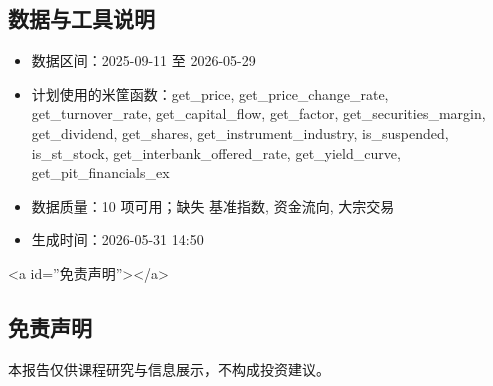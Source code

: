 \documentclass[12pt,a4paper]{article}
\begin{document}
\subsection{ 数据与工具说明}
\begin{itemize}
\item 数据区间：2025-09-11 至 2026-05-29
\item 计划使用的米筐函数：get\_price, get\_price\_change\_rate, get\_turnover\_rate, get\_capital\_flow, get\_factor, get\_securities\_margin, get\_dividend, get\_shares, get\_instrument\_industry, is\_suspended, is\_st\_stock, get\_interbank\_offered\_rate, get\_yield\_curve, get\_pit\_financials\_ex
\item 数据质量：10 项可用；缺失 基准指数, 资金流向, 大宗交易
\item 生成时间：2026-05-31 14:50
\end{itemize}

<a id=''免责声明''></a>

\subsection{ 免责声明}
本报告仅供课程研究与信息展示，不构成投资建议。
\end{document}
